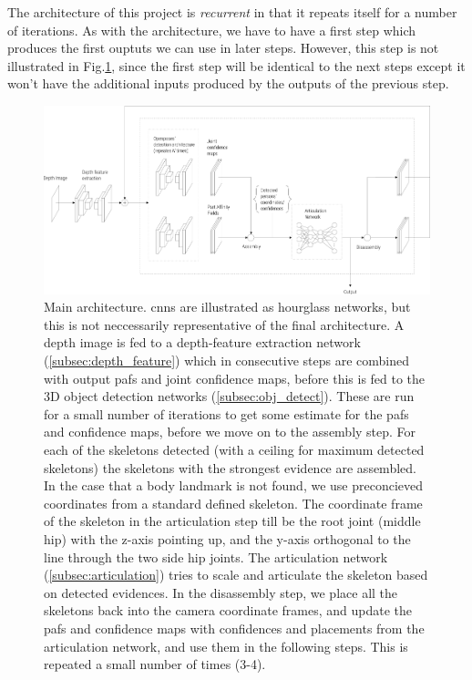 The architecture of this project is \emph{recurrent} in that it repeats itself for a number of iterations. As with the \cite{cao2017realtime} architecture, we have to have a first step which produces the first ouptuts we can use in later steps. However, this step is not illustrated in Fig.\ref{fig:arch_main}, since the first step will be identical to the next steps except it won't have the additional inputs produced by the outputs of the previous step.

\begin{figure}[h]
  \centering
  \includegraphics[width=\textwidth]{img/architecture_main}
  \caption[Main architecture]{Main architecture. \gls{cnn}s are illustrated as hourglass networks, but this is not neccessarily representative of the final architecture. A depth image is fed to a depth-feature extraction network (\ref{subsec:depth_feature}) which in consecutive steps are combined with output \gls{paf}s and joint confidence maps, before this is fed to the 3D object detection networks (\ref{subsec:obj_detect}). These are run for a small number of iterations to get some estimate for the \gls{paf}s and confidence maps, before we move on to the assembly step. For each of the skeletons detected (with a ceiling for maximum detected skeletons) the skeletons with the strongest evidence are assembled. In the case that a body landmark is not found, we use preconcieved coordinates from a standard defined skeleton. The coordinate frame of the skeleton in the articulation step till be the root joint (middle hip) with the z-axis pointing up, and the y-axis orthogonal to the line through the two side hip joints. The articulation network (\ref{subsec:articulation}) tries to scale and articulate the skeleton based on detected evidences. In the disassembly step, we place all the skeletons back into the camera coordinate frames, and update the \gls{paf}s and confidence maps with confidences and placements from the articulation network, and use them in the following steps. This is repeated a small number of times (3-4).}
  \label{fig:arch_main}
\end{figure}

